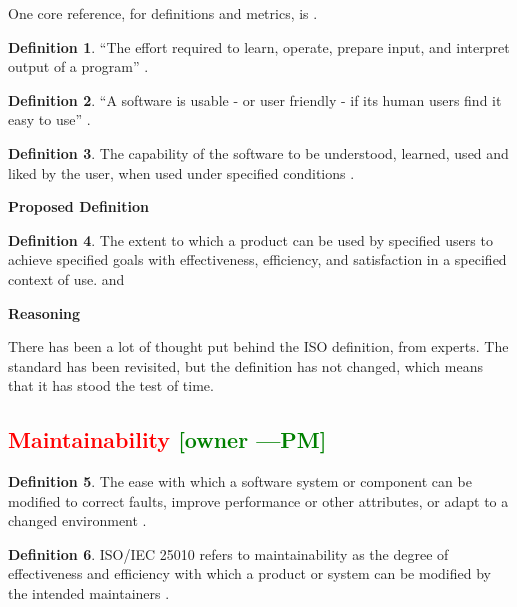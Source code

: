 \documentclass[letterpaper,cleveref]{lipics-v2019}
\newcommand{\authornote}[3]{\textcolor{#1}{[#3 ---#2]}}
\newcommand{\authornote}[3]{}
\newcommand{\pmi}[1]{\authornote{green}{PM}{#1}} %
\newcommand{\notdone}[1]{\textcolor{red}{#1}}
\theoremstyle{definition}
\newtheorem{defn}{Definition}
\begin{document}
One core reference, for definitions and metrics, is
\citet{bevan1995measuring}.

\begin{defn}
  ``The effort required to learn, operate, prepare input, and interpret output
  of a program'' \citep{McCallEtAl1977}. 
\end{defn}

\begin{defn}
  ``A software is usable - or user friendly - if its human users find it easy
  to use'' \citep{ghezzi1991fundamentals}.
\end{defn}

\begin{defn}
  The capability of the software to be understood, learned, used and liked by
  the user, when used under specified conditions \cite{ISO9126}.
\end{defn}
\noindent \textbf{Proposed Definition}

\begin{defn}
  The extent to which a product can be used by specified users to achieve
  specified goals with effectiveness, efficiency, and satisfaction in a
  specified context of use.
  \cite{ISO16982:2002} and \cite{ISO9241:11}
\end{defn}

\noindent \textbf{Reasoning}

There has been a lot of thought put behind the ISO definition, from experts.
The standard has been revisited, but the definition has not changed, which 
means that it has stood the test of time.

\subsection{\notdone{Maintainability} \pmi{owner}}

\begin{defn} \label{MaintainabilityDefnSelected1} 
  The ease with which a software system or component can be modified to correct
  faults, improve performance or other attributes, or adapt to a changed
  environment \citep{IEEEStdGlossarySET1990}.
\end{defn}

\begin{defn}
  ISO/IEC 25010 refers to maintainability as the degree of effectiveness and
  efficiency with which a product or system can be modified by the intended
  maintainers \citep{ISO/IEC25010}.
\end{defn}
\end{document}

